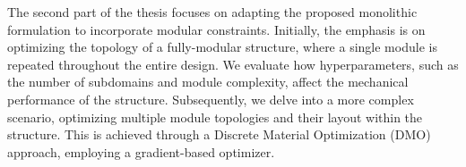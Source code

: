 The second part of the thesis focuses on adapting the proposed monolithic formulation to incorporate modular constraints. Initially, the emphasis is on optimizing the topology of a fully-modular structure, where a single module is repeated throughout the entire design. We evaluate how hyperparameters, such as the number of subdomains and module complexity, affect the mechanical performance of the structure. Subsequently, we delve into a more complex scenario, optimizing multiple module topologies and their layout within the structure. This is achieved through a Discrete Material Optimization (DMO) approach, employing a gradient-based optimizer.